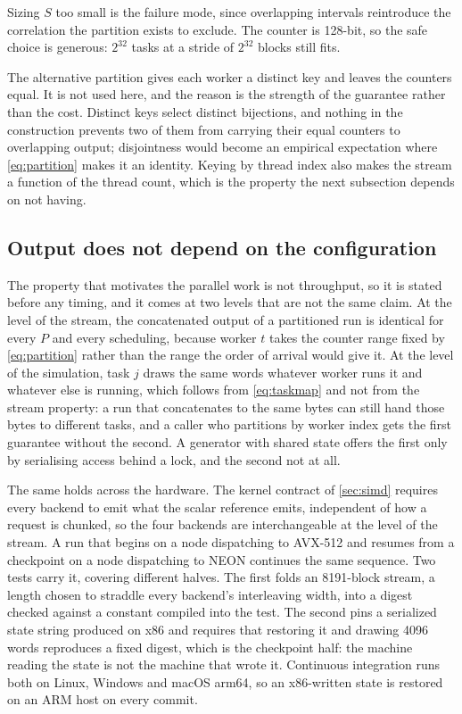 \documentclass[acmsmall,screen,review]{acmart}
\theoremstyle{acmdefinition}
\begin{document}
Sizing $S$ too small is the failure mode, since overlapping intervals
reintroduce the correlation the partition exists to exclude. The counter is
128-bit, so the safe choice is generous: $2^{32}$ tasks at a stride of $2^{32}$
blocks still fits.

The alternative partition gives each worker a distinct key and leaves the
counters equal. It is not used here, and the reason is the strength of the
guarantee rather than the cost. Distinct keys select distinct bijections, and
nothing in the construction prevents two of them from carrying their equal
counters to overlapping output; disjointness would become an empirical
expectation where \cref{eq:partition} makes it an identity. Keying by thread
index also makes the stream a function of the thread count, which is the
property the next subsection depends on not having.

\subsection{Output does not depend on the configuration}\label{sec:reproducible}

The property that motivates the parallel work is not throughput, so it is
stated before any timing, and it comes at two levels that are not the same
claim. At the level of the stream, the concatenated output of a
partitioned run is identical for every $P$ and every scheduling, because worker
$t$ takes the counter range fixed by \cref{eq:partition} rather than the range
the order of arrival would give it. At the level of the simulation, task $j$
draws the same words whatever worker runs it and whatever else is running,
which follows from \cref{eq:taskmap} and not from the stream property: a run
that concatenates to the same bytes can still hand those bytes to different
tasks, and a caller who partitions by worker index gets the first guarantee
without the second. A generator with shared state offers the first only by
serialising access behind a lock, and the second not at all.

The same holds across the hardware. The kernel contract of \cref{sec:simd}
requires every backend to emit what the scalar reference emits, independent of
how a request is chunked, so the four backends are interchangeable at the level
of the stream. A run that begins on a node dispatching to AVX-512 and resumes
from a checkpoint on a node dispatching to NEON continues the same sequence.
Two tests carry it, covering different halves. The first folds an 8191-block
stream, a length chosen to straddle every backend's interleaving width, into a
digest checked against a constant compiled into the test. The second pins a
serialized state string produced on x86 and requires that restoring it and
drawing 4096 words reproduces a fixed digest, which is the checkpoint half: the
machine reading the state is not the machine that wrote it. Continuous
integration runs both on Linux, Windows and macOS arm64, so an x86-written state
is restored on an ARM host on every commit.
\end{document}
